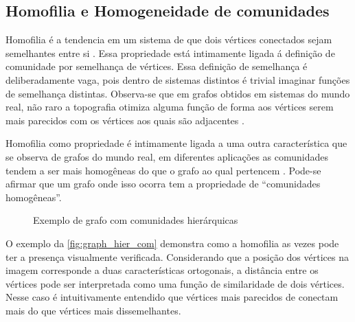 \documentclass[notes.tex]{subfiles}
\begin{document}
\subsection{Homofilia e Homogeneidade de comunidades}

Homofilia é a tendencia em um sistema de que dois vértices conectados sejam semelhantes entre si \cite{akoglu2009rtg}.
Essa propriedade está intimamente ligada á definição de comunidade por semelhança de vértices.
Essa definição de semelhança é deliberadamente vaga, pois dentro de sistemas distintos é trivial imaginar funções de semelhança distintas.
Observa-se que em grafos obtidos em sistemas do mundo real, não raro a topografia otimiza alguma função de forma aos vértices serem mais parecidos com os vértices aos quais são adjacentes \cite{largeron2015generating}.

Homofilia como propriedade é intimamente ligada a uma outra característica que se observa de grafos do mundo real, em diferentes aplicações as comunidades tendem a ser mais homogêneas do que o grafo ao qual pertencem \cite{largeron2015generating}.
Pode-se afirmar que um grafo onde isso ocorra tem a propriedade de ``comunidades homogêneas''.

\begin{figure}[htpb]
    \centering
    \caption{Exemplo de grafo com comunidades hierárquicas}\label{fig:graph_hier_com}
\end{figure}

O exemplo da \autoref{fig:graph_hier_com} demonstra como a homofilia as vezes pode ter a presença visualmente verificada.
Considerando que a posição dos vértices na imagem corresponde a duas características ortogonais, a distância entre os vértices pode ser interpretada como uma função de similaridade de dois vértices.
Nesse caso é intuitivamente entendido que vértices mais parecidos de conectam mais do que vértices mais dissemelhantes.
\end{document}
